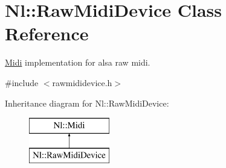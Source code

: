 \hypertarget{classNl_1_1RawMidiDevice}{\section{Nl\-:\-:Raw\-Midi\-Device Class Reference}
\label{classNl_1_1RawMidiDevice}
}


\hyperlink{classNl_1_1Midi}{Midi} implementation for alsa raw midi.  




{\ttfamily \#include $<$rawmididevice.\-h$>$}

Inheritance diagram for Nl\-:\-:Raw\-Midi\-Device\-:\begin{figure}[H]
\begin{center}
\leavevmode
\includegraphics[height=2.000000cm]{classNl_1_1RawMidiDevice}
\end{center}
\end{figure}
